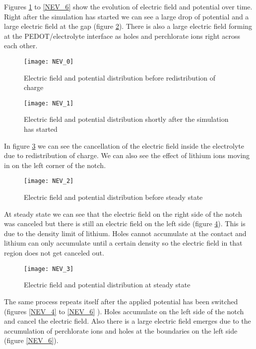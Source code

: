 Figures \ref{NEV_0} to \ref{NEV_6} show the evolution of electric field and potential over time. Right after the simulation has started we can see a large drop of potential and a large electric field at the gap (figure \ref{NEV_1}). There is also a large electric field forming at the PEDOT/electrolyte interface as holes and perchlorate ions right across each other.

\begin{figure}[!htp]
\centering
\texttt{[image: NEV\_0]}
\caption{Electric field and potential distribution before redistribution of charge} 
\label{NEV_0}
\end{figure}

\begin{figure}[!htp]
\centering
\texttt{[image: NEV\_1]}
\caption{Electric field and potential distribution shortly after the simulation has started} 
\label{NEV_1}
\end{figure}
In figure \ref{NEV_2} we can see the cancellation of the electric field inside the electrolyte due to redistribution of charge. We can also see the effect of lithium ions moving in on the left corner of the notch.

\begin{figure}[!htp]
\centering
\texttt{[image: NEV\_2]}
\caption{Electric field and potential distribution before steady state} 
\label{NEV_2}
\end{figure}

At steady state we can see that the electric field on the right side of the notch was canceled but there is still an electric field on the left side (figure \ref{NEV_3}). This is due to the density limit of lithium. Holes cannot accumulate at the contact and lithium can only accumulate until a certain density so the electric field in that region does not get canceled out.

\begin{figure}[!htp]
\centering
\texttt{[image: NEV\_3]}
\caption{Electric field and potential distribution at steady state} 
\label{NEV_3}
\end{figure}

The same process repeats itself after the applied potential has been switched (figures \ref{NEV_4} to \ref{NEV_6} ). Holes accumulate on the left side of the notch and cancel the electric field. Also there is a large electric field emerges due to the accumulation of perchlorate ions and holes at the boundaries on the left side (figure \ref{NEV_6}).

